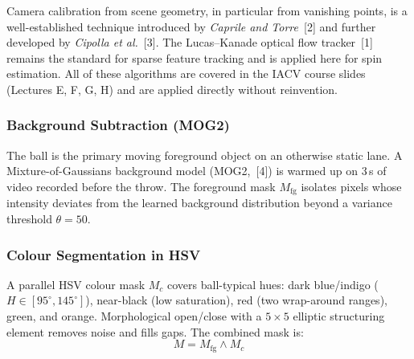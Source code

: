 \documentclass[11pt,twoside]{article}
\begin{document}
Camera calibration from scene geometry, in particular from vanishing points, is a well-established technique introduced by \emph{Caprile and Torre}~[2] and further developed by \emph{Cipolla et al.}~[3].
The Lucas--Kanade optical flow tracker~[1] remains the standard for sparse feature tracking and is applied here for spin estimation.
All of these algorithms are covered in the IACV course slides (Lectures E, F, G, H) and are applied directly without reinvention.

{}
\label{sec:method}

{}

\subsubsection*{Background Subtraction (MOG2)}
The ball is the primary moving foreground object on an otherwise static lane.
A Mixture-of-Gaussians background model (MOG2,~[4]) is warmed up on 3\,s of video recorded before the throw.
The foreground mask $M_{\text{fg}}$ isolates pixels whose intensity deviates from the learned background distribution beyond a variance threshold $\theta = 50$.

\subsubsection*{Colour Segmentation in HSV}
A parallel HSV colour mask $M_c$ covers ball-typical hues: dark blue/indigo ($H \in [95^\circ, 145^\circ]$), near-black (low saturation), red (two wrap-around ranges), green, and orange.
Morphological open/close with a $5 \times 5$ elliptic structuring element removes noise and fills gaps.
The combined mask is:
\begin{equation}
    M = M_{\text{fg}} \wedge M_c
\end{equation}
\end{document}
